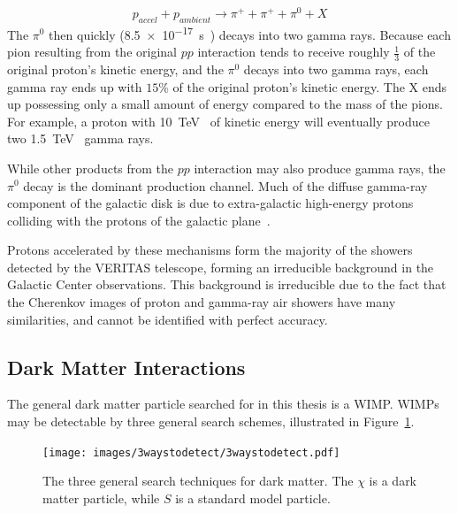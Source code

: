     $$ p_{accel} + p_{ambient} \rightarrow \pi^+ + \pi^+ + \pi^0 + X $$
  The $\pi^{0}$ then quickly (\SI{8.5e-17}{s}~\cite{pdg2016}) decays into two gamma rays.
  Because each pion resulting from the original $pp$ interaction tends to receive roughly $\frac{1}{3}$ of the original proton's kinetic energy, and the $\pi^0$ decays into two gamma rays, each gamma ray ends up with \nicetilde$15\%$ of the original proton's kinetic energy.
  The X ends up possessing only a small amount of energy compared to the mass of the pions.
  For example, a proton with \SI{10}{\TeV{}} of kinetic energy will eventually produce two \SI{1.5}{\TeV{}} gamma rays.
  
  While other products from the $pp$ interaction may also produce gamma rays, the $\pi^0$ decay is the dominant production channel.
  Much of the diffuse gamma-ray component of the galactic disk is due to extra-galactic high-energy protons colliding with the protons of the galactic plane~\cite{GalacticDiffuseGammaRays,extragalactic_agn}.
  
  Protons accelerated by these mechanisms form the majority of the showers detected by the VERITAS telescope, forming an irreducible background in the Galactic Center observations.
  This background is irreducible due to the fact that the Cherenkov images of proton and gamma-ray air showers have many similarities, and cannot be identified with perfect accuracy.
  
  \subsection{Dark Matter Interactions}\label{dmgammaproduction}
    
    The general dark matter particle searched for in this thesis is a WIMP.
    WIMPs may be detectable by three general search schemes, illustrated in Figure~\ref{fig:3_searches}.

    \begin{figure}[!h]
      \centering
      \texttt{[image: images/3waystodetect/3waystodetect.pdf]}
      \caption[Three Search Techniques]{
        The three general search techniques for dark matter.
        The $\chi$ is a dark matter particle, while $S$ is a standard model particle.
      }
      \label{fig:3_searches}
    \end{figure}
    
